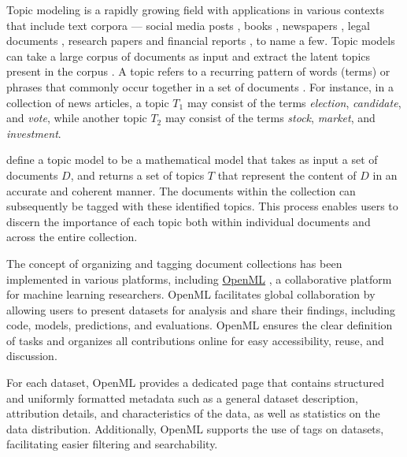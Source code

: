 Topic modeling is a rapidly growing field with applications in various contexts that include text corpora — social media posts \cite{curiskis_evaluation_2020,paul_discovering_2014,pennacchiotti_investigating_2011}, books \cite{raj_p_m_sentiment_2022}, newspapers \cite{jacobi_quantitative_2018,nicholson_search_2020,marjanen_topic_2020}, legal documents \cite{silveira_topic_nodate,oneill_analysis_2016}, research papers \cite{asmussen_smart_2019} and financial reports \cite{el_mokhtari_using_2020,garcia-mendez_automatic_2023}, to name a few. Topic models can take a large corpus of documents as input and extract the latent topics present in the corpus \cite{blei_latent_2001}. A topic refers to a recurring pattern of words (terms) or phrases that commonly occur together in a set of documents \cite{abdelrazek_topic_2022}. For instance, in a collection of news articles, a topic $T_1$ may consist of the terms \textit{election}, \textit{candidate}, and \textit{vote}, while another topic $T_2$ may consist of the terms \textit{stock}, \textit{market}, and \textit{investment}.

\citet{churchill_evolution_2022} define a topic model to be a mathematical model that takes as input a set of documents $D$, and returns a set of topics $T$ that represent the content of $D$ in an accurate and coherent manner. The documents within the collection can subsequently be tagged with these identified topics. This process enables users to discern the importance of each topic both within individual documents and across the entire collection.

The concept of organizing and tagging document collections has been implemented in various platforms, including \href{https://www.openml.org/}{OpenML} \cite{vanschoren_openml_2014}, a collaborative platform for machine learning researchers. OpenML facilitates global collaboration by allowing users to present datasets for analysis and share their findings, including code, models, predictions, and evaluations. OpenML ensures the clear definition of tasks and organizes all contributions online for easy accessibility, reuse, and discussion.

For each dataset, OpenML provides a dedicated page that contains structured and uniformly formatted metadata such as a general dataset description, attribution details, and characteristics of the data, as well as statistics on the data distribution. Additionally, OpenML supports the use of tags on datasets, facilitating easier filtering and searchability.

